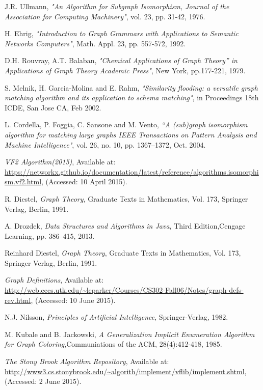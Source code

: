 
 \begin{thebibliography}{19}

	J.R. Ullmann, 
	\emph{"An Algorithm for Subgraph Isomorphism, Journal of the Association for Computing Machinery"},
	vol. 23, pp. 31-42, 1976.

	H. Ehrig, 
	\emph{"Introduction to Graph Grammars with Applications to Semantic Networks Computers"},
	Math. Appl. 23, pp. 557-572, 1992.

	D.H. Rouvray, A.T. Balaban, 
	\emph{"Chemical Applications of Graph Theory” in Applications of Graph Theory Academic Press"},
	New York, pp.177-221, 1979.

	S. Melnik, H. Garcia-Molina and E. Rahm, 
	\emph{"Similarity flooding: a versatile graph matching algorithm and its application to schema matching"},
	in Proceedings 18th ICDE, San Jose
	CA, Feb 2002.
	
	L. Cordella, P. Foggia, C. Sansone and M. Vento, 
	\emph{“A (sub)graph isomorphism algorithm for matching large graphs IEEE Transactions on Pattern Analysis and Machine Intelligence"},
	vol. 26, no. 10, pp. 1367–1372, Oct. 2004.

	\emph{VF2 Algorithm(2015)},
	Available at: \url{https://networkx.github.io/documentation/latest/reference/algorithms.isomorphism.vf2.html},
	(Accessed: 10 April 2015).
	
	R. Diestel, 
	\emph{Graph Theory},
	Graduate Texts in Mathematics,
	Vol. 173, Springer Verlag, Berlin, 1991.

	A. Drozdek, 
	\emph{Data Structures and Algorithms in Java},
	Third Edition,Cengage Learning, pp. 386–415, 2013.	

	Reinhard Diestel, 
	\emph{Graph Theory},
	Graduate Texts in Mathematics,
	Vol. 173, Springer Verlag, Berlin, 1991.

	\emph{Graph Definitions},
	Available at: \url{http://web.eecs.utk.edu/~leparker/Courses/CS302-Fall06/Notes/graph-defs-rev.html},
	(Accessed: 10 June 2015).

	N.J. Nilsson, 
	\emph{Principles of Artificial Intelligence},
	Springer-Verlag, 1982.	

	M. Kubale and B. Jackowski, 
	\emph{A Generalization Implicit Enumeration Algorithm for Graph Coloring},Communiations of the ACM, 28(4):412-418, 1985.

	\emph{The Stony Brook Algorithm Repository},
	Available at: \url{http://www3.cs.stonybrook.edu/~algorith/implement/vflib/implement.shtml},
	(Accessed: 2 June 2015).	

\end{thebibliography}
